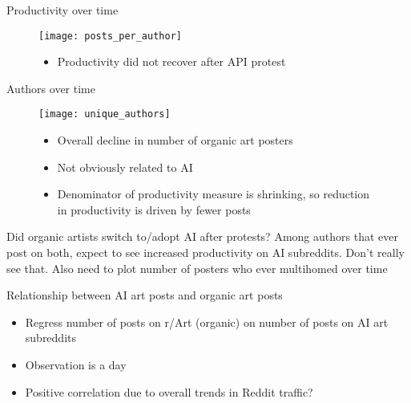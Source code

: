 \documentclass[aspectratio=169]{beamer}
\def\defaultscalefig{0.4}
\begin{document}
\begin{frame}{Productivity over time}
	\begin{figure}
		\begin{minipage}{0.45\textwidth}
			\centering
			\texttt{[image: posts\_per\_author]}
		\end{minipage}\hfill
		\begin{minipage}{0.45\textwidth}
			\centering
			\begin{itemize}
				\item Productivity did not recover after API protest
			\end{itemize}
		\end{minipage}
	\end{figure}
\end{frame}

\begin{frame}{Authors over time}
	\begin{figure}
		\begin{minipage}{0.45\textwidth}
			\centering
			\texttt{[image: unique\_authors]}
		\end{minipage}\hfill
		\begin{minipage}{0.45\textwidth}
			\centering
			\begin{itemize}
				\item Overall decline in number of organic art posters
				\item Not obviously related to AI
				\item Denominator of productivity measure is shrinking,
					so reduction in productivity is driven by fewer posts
			\end{itemize}
		\end{minipage}
	\end{figure}
\end{frame}

\begin{frame}{Did organic artists switch to/adopt AI after protests?}
	Among authors that ever post on both,
	expect to see increased productivity on AI subreddits.
	Don't really see that.
	Also need to plot number of posters who ever multihomed over time
\end{frame}

\begin{frame}{Relationship between AI art posts and organic art posts}
	\centering
	\begin{itemize}
		\item Regress number of posts on r/Art (organic) on number of posts on AI art subreddits
		\item Observation is a day
		\item Positive correlation due to overall trends in Reddit traffic?
	\end{itemize}
\end{frame}
\end{document}
